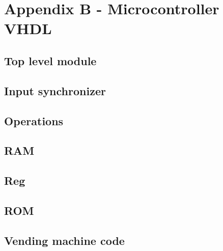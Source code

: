 \section{Appendix B - Microcontroller VHDL}
\subsection{Top level module}


\subsection{Input synchronizer}


\subsection{Operations}


\subsection{RAM}


\subsection{Reg}


\subsection{ROM}


\subsection{Vending machine code}

